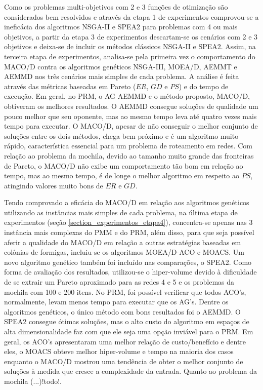 Como os problemas multi-objetivos com 2 e 3 funções de otimização são considerados bem resolvidos e através da etapa 1 de experimentos comprovou-se a ineficácia dos algoritmos NSGA-II e SPEA2 para problemas com 4 ou mais objetivos, a partir da etapa 3 de experimentos descartam-se os cenários com 2 e 3 objetivos e deixa-se de incluir os métodos clássicos NSGA-II e SPEA2. Assim, na terceira etapa de experimentos, analisa-se pela primeira vez o comportamento do MACO/D contra os algoritmos genéticos NSGA-III, MOEA/D, AEMMT e AEMMD nos três cenários mais simples de cada problema. A análise é feita através das métricas baseadas em Pareto ($ER$, $GD$ e $PS$) e do tempo de execução. Em geral, no PRM, o AG AEMMD e o método proposto, MACO/D, obtiveram os melhores resultados. O AEMMD consegue soluções de qualidade um pouco melhor que seu oponente, mas ao mesmo tempo leva até quatro vezes mais tempo para executar. O MACO/D, apesar de não conseguir o melhor conjunto de soluções entre os dois métodos, chega bem próximo e é um algoritmo muito rápido, característica essencial para um problema de roteamento em redes. Com relação ao problema da mochila, devido ao tamanho muito grande das fronteiras de Pareto, o MACO/D não exibe um comportamento tão bom em relação ao tempo, mas ao mesmo tempo, é de longe o melhor algoritmo em respeito ao $PS$, atingindo valores muito bons de $ER$ e $GD$.

Tendo comprovado a eficácia do MACO/D em relação aos algoritmos genéticos utilizando as instâncias mais simples de cada problema, na última etapa de experimentos (seção \ref{section_experimentos_etapa4}), concentra-se apenas nas 3 instância mais complexas do PMM e do PRM, além disso, para que seja possível aferir a qualidade do MACO/D em relação a outras estratégias baseadas em colônias de formigas, incluiu-se os algoritmos MOEA/D-ACO e MOACS. Um novo algoritmo genético também foi incluído nas comparações, o SPEA2. Como forma de avaliação dos resultados, utilizou-se o hiper-volume devido à dificuldade de se extrair um Pareto aproximado para as redes 4 e 5 e os problemas da mochila com 100 e 200 itens. No PRM, foi possível verificar que todos ACO's, normalmente, levam menos tempo para executar que os AG's. Dentre os algoritmos genéticos, o único método com bons resultados foi o AEMMD. O SPEA2 consegue ótimas soluções, mas o alto custo do algoritmo em espaços de alta dimensionalidade faz com que ele seja uma opção inviável para o PRM. Em geral, os ACO's apresentaram uma melhor relação de custo/benefício e dentre eles, o MOACS obteve melhor hiper-volume e tempo na maioria dos casos enquanto o MACO/D mostrou uma tendência de obter o melhor conjunto de soluções à medida que cresce a complexidade da entrada. Quanto ao problema da mochila (...)!todo!.

